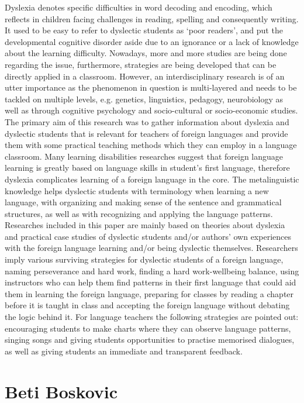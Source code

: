 \documentclass[twoside,14pt,a4paper,notitlepage]{memoir}
\begin{document}
Dyslexia denotes specific difficulties in word decoding and encoding, which reflects in children facing challenges in reading, spelling and consequently writing. It used to be easy to refer to dyslectic students as ‘poor readers’, and put the developmental cognitive disorder aside due to an ignorance or a lack of knowledge about the learning difficulty.  Nowadays, more and more studies are being done regarding the issue, furthermore, strategies are being developed that can be directly applied in a classroom. However, an interdisciplinary research is of an utter importance as the phenomenon in question is multi-layered and needs to be tackled on multiple levels, e.g. genetics, linguistics, pedagogy, neurobiology as well as through cognitive psychology and socio-cultural or socio-economic studies. The primary aim of this research was to gather information about dyslexia and dyslectic students that is relevant for teachers of foreign languages and provide them with some practical teaching methods which they can employ in a language classroom. Many learning disabilities researches suggest that foreign language learning is greatly based on language skills in student’s first language, therefore dyslexia complicates learning of a foreign language in the core. The metalinguistic knowledge helps dyslectic students with terminology when learning a new language, with organizing and making sense of the sentence and grammatical structures, as well as with recognizing and applying the language patterns. Researches included in this paper are mainly based on theories about dyslexia and practical case studies of dyslectic students and/or authors’ own experiences with the foreign language learning and/or being dyslectic themselves. Researchers imply various surviving strategies for dyslectic students of a foreign language, naming perseverance and hard work, finding a hard work-wellbeing balance, using instructors who can help them find patterns in their first language that could aid them in learning the foreign language, preparing for classes by reading a chapter before it is taught in class and accepting the foreign language without debating the logic behind it. For language teachers the following strategies are pointed out: encouraging students to make charts where they can observe language patterns, singing songs and giving students opportunities to practise memorised dialogues, as well as giving students an immediate and transparent feedback.

\section*{Beti Boskovic}
\end{document}
